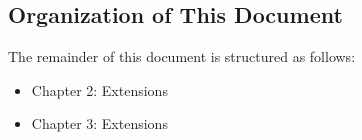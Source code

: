 %
%
%
%
%

\subsection{Organization of This Document}
The remainder of this document is structured as follows:

\begin{itemize}
 \item Chapter 2: {\XMP} Extensions
 \item Chapter 3: {\OACC} Extensions
\end{itemize}
